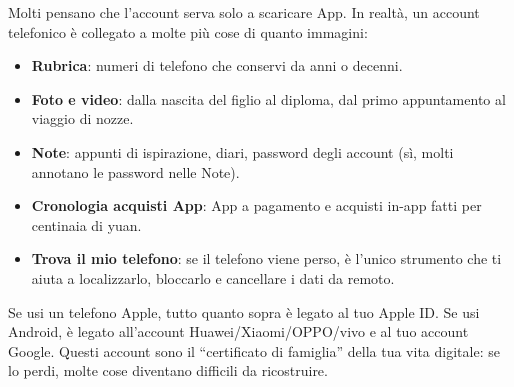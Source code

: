 


Molti pensano che l'account serva solo a scaricare App. In realtà, un account telefonico è collegato a molte più cose di quanto immagini:

\begin{itemize}
  \item \textbf{Rubrica}: numeri di telefono che conservi da anni o decenni.
  \item \textbf{Foto e video}: dalla nascita del figlio al diploma, dal primo appuntamento al viaggio di nozze.
  \item \textbf{Note}: appunti di ispirazione, diari, password degli account (sì, molti annotano le password nelle Note).
  \item \textbf{Cronologia acquisti App}: App a pagamento e acquisti in-app fatti per centinaia di yuan.
  \item \textbf{Trova il mio telefono}: se il telefono viene perso, è l'unico strumento che ti aiuta a localizzarlo, bloccarlo e cancellare i dati da remoto.
\end{itemize}

Se usi un telefono Apple, tutto quanto sopra è legato al tuo Apple ID. Se usi Android, è legato all'account Huawei/Xiaomi/OPPO/vivo e al tuo account Google. Questi account sono il “certificato di famiglia” della tua vita digitale: se lo perdi, molte cose diventano difficili da ricostruire.


